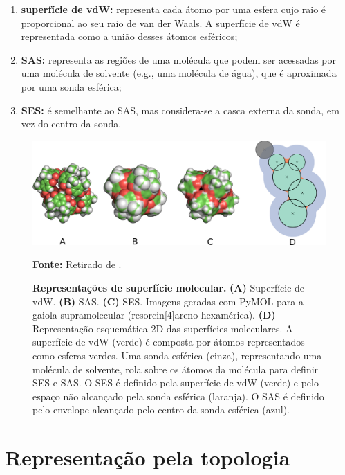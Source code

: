 \documentclass[Portugues]{phdquali}
\def\eg{e.g.\onedot}
\begin{document}
\begin{enumerate}[label=\textbf{(\Alph*)}]
  \item \textbf{superfície de vdW:} representa cada átomo por uma esfera cujo raio é proporcional ao seu raio de van der Waals. A superfície de vdW é representada como a união desses átomos esféricos; 
  \item \textbf{SAS:} representa as regiões de uma molécula que podem ser acessadas por uma molécula de solvente (\eg, uma molécula de água), que é aproximada por uma sonda esférica;
  \item \textbf{SES:} é semelhante ao SAS, mas considera-se a casca externa da sonda, em vez do centro da sonda.
\end{enumerate}

\begin{figure}[ht]
  \centerline{\includegraphics[scale=0.8]{images/surface-representation.png}}
  \centerline{\scriptsize{\textbf{Fonte:} Retirado de \cite{guerra2023B}.}}
  \caption[Representações de superfície molecular]{\textbf{Representações de superfície molecular.} \textbf{(A)} Superfície de vdW. \textbf{(B)} SAS. \textbf{(C)} SES. Imagens geradas com PyMOL para a gaiola supramolecular (resorcin[4]areno-hexamérica). \textbf{(D)} Representação esquemática 2D das superfícies moleculares. A superfície de vdW (verde) é composta por átomos representados como esferas verdes. Uma sonda esférica (cinza), representando uma molécula de solvente, rola sobre os átomos da molécula para definir SES e SAS. O SES é definido pela superfície de vdW (verde) e pelo espaço não alcançado pela sonda esférica (laranja). O SAS é definido pelo envelope alcançado pelo centro da sonda esférica (azul).}
  \label{fig:surface-representation}
\end{figure}

\section{Representação pela topologia}

\end{document}
